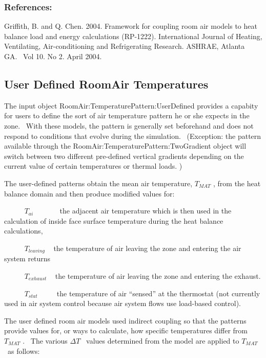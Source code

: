 \subsubsection{References:}\label{references-005}

Griffith, B. and Q. Chen. 2004. Framework for coupling room air models to heat balance load and energy calculations (RP-1222). International Journal of Heating, Ventilating, Air-conditioning and Refrigerating Research. ASHRAE, Atlanta GA.~ Vol 10. No 2. April 2004.

\subsection{User Defined RoomAir Temperatures}\label{user-defined-roomair-temperatures}

The input object RoomAir:TemperaturePattern:UserDefined provides a capabity for users to define the sort of air temperature pattern he or she expects in the zone.~ With these models, the pattern is generally set beforehand and does not respond to conditions that evolve during the simulation.~ (Exception: the pattern available through the RoomAir:TemperaturePattern:TwoGradient object will switch between two different pre-defined vertical gradients depending on the current value of certain temperatures or thermal loads. )

The user-defined patterns obtain the mean air temperature, \({T_{MAT}}\) , from the heat balance domain and then produce modified values for:

~~~~~ \({T_{ai}}\) ~~~~~~ the adjacent air temperature which is then used in the calculation of inside face surface temperature during the heat balance calculations,

~~~~~ \({T_{leaving}}\) ~ the temperature of air leaving the zone and entering the air system returns

~~~~~ \({T_{exhaust}}\) ~ the temperature of air leaving the zone and entering the exhaust.

~~~~~ \({T_{stat}}\) ~~~~ the temperature of air ``sensed'' at the thermostat (not currently used in air system control because air system flows use load-based control).

The user defined room air models used indirect coupling so that the patterns provide values for, or ways to calculate, how specific temperatures differ from \({T_{MAT}}\) .~ The various \(\Delta T\) ~values determined from the model are applied to \({T_{MAT}}\) ~as follows:

